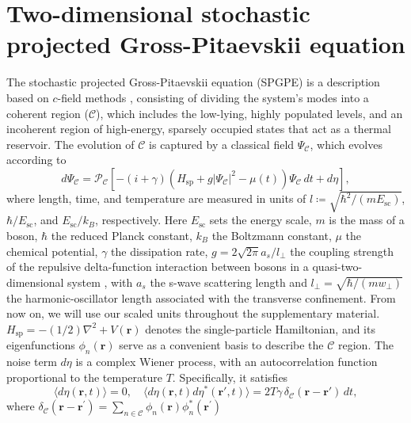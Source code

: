 \documentclass[aps,prl,twocolumn,showpacs,notitlepage,floatfix,superscriptaddress]{revtex4-1}
\begin{document}
\section{Two-dimensional stochastic projected Gross-Pitaevskii equation}
The stochastic projected Gross-Pitaevskii equation (SPGPE) is a description based on $c$-field methods \cite{blakie2008dynamics}, consisting of dividing the system's modes into a coherent region ($\mathcal{C}$), which includes the low-lying, highly populated levels, and an incoherent region of high-energy, sparsely occupied states that act as a thermal reservoir. The evolution of $\mathcal{C}$ is captured by a classical field $\Psi_{\mathcal{C}}$, which evolves according to
\begin{equation}\label{2D_dimensionless_SPGPE}
    d{\Psi_\mathcal{C}} = \mathcal{P}_{\mathcal{C}} \left[ -(i + \gamma) \left( H_{\textrm{sp}} + g |\Psi_\mathcal{C}|^{2} -\mu(t) \right) \Psi_\mathcal{C} \, dt + d \eta \right],
\end{equation}
where length, time, and temperature are measured in units of $l \coloneqq \sqrt{\hbar^2 / \left( m E_{\textrm{sc}} \right)}$, $\hbar / E_{\textrm{sc}}$, and $E_{\textrm{sc}} / k_B$, respectively. Here $E_{\textrm{sc}}$ sets the energy scale, $m$ is the mass of a boson, $\hbar$ the reduced Planck constant, $k_B$ the Boltzmann constant, $\mu$ the chemical potential, $\gamma$ the dissipation rate,
$
g
=
2 \sqrt{2 \pi} a_s / l_{\perp}
$
the coupling strength of the repulsive delta-function interaction between bosons
in a quasi-two-dimensional system \cite{pitaevskii2003bose,Bradley2015}, with
$a_s$ the s-wave scattering length and
$l_{\perp}=\sqrt{\hbar/(mw_{\perp})}$ the harmonic-oscillator length associated with the transverse confinement.
From now on, we will use our scaled units throughout the supplementary material.
$H_{\textrm{sp}}=-(1/2)\nabla^{2}+V(\boldsymbol{r})$ denotes the single-particle Hamiltonian, and its eigenfunctions $\phi_{n}(\boldsymbol{r})$ serve as a convenient basis to describe the $\mathcal{C}$ region.
The noise term $d\eta$ is a complex Wiener process, with an autocorrelation function proportional to the temperature $T$. Specifically, it satisfies
\begin{equation}
\langle d \eta (\boldsymbol{r}, t) \rangle = 0, \quad \langle d \eta (\boldsymbol{r}, t) d \eta^{*}(\boldsymbol{r}', t) \rangle = 2T\gamma\, \delta_{\mathcal{C}}(\boldsymbol{r} - \boldsymbol{r}')\, dt,
\end{equation}
where $\delta_{\mathcal{C}}(\boldsymbol{r}-\boldsymbol{r}^{\prime})=\sum_{n\in \mathcal{C}}\phi_{n}(\boldsymbol{r})\phi^{*}_{n}(\boldsymbol{r}^{\prime})$
\end{document}
